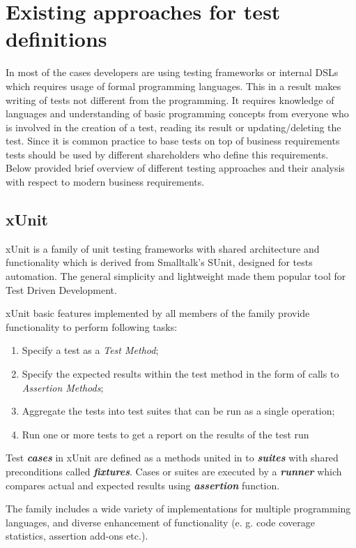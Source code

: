 \section{Existing approaches for test definitions}
\label{sec:testApproaches}
In most of the cases developers are using testing frameworks or internal DSLs which requires usage of formal programming languages. This in a result makes writing of tests not different from the programming. It requires knowledge of languages and understanding of basic programming concepts from everyone who is involved in the creation of a test, reading its result or updating/deleting the test.
Since it is common practice to base tests on top of business requirements tests should be used by different shareholders who define this requirements.
Below provided brief overview of different testing approaches and their analysis with respect to modern business requirements.

\subsection{xUnit}
xUnit is a family of unit testing frameworks with shared architecture and functionality which is derived from Smalltalk's SUnit, designed for tests automation\cite{xunit}\cite{xunitFowler}. The general simplicity and lightweight made them popular tool for Test Driven Development\cite{xunitFowler}.

xUnit basic features implemented by all members of the family provide functionality to perform following tasks\cite{xunit}:
\begin{enumerate}
	\item Specify a test as a \textit{Test Method};
	\item Specify the expected results within the test method in the form of calls to \textit{Assertion Methods};
	\item Aggregate the tests into test suites that can be run as a single operation;
	\item Run one or more tests to get a report on the results of the test run
\end{enumerate}

Test \textbf{\textit{cases}} in xUnit are defined as a methods united in to \textbf{\textit{suites}} with shared preconditions called \textbf{\textit{fixtures}}.  Cases or suites are executed by a \textbf{\textit{runner}} which compares actual and expected results using \textbf{\textit{assertion}} function.

The family includes a wide variety of implementations for multiple programming languages, and diverse enhancement of functionality (e. g. code coverage statistics, assertion add-ons etc.)\cite{xunitWiki}.

